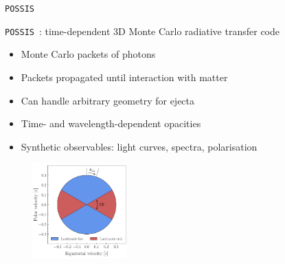 \documentclass[usenames,dvipsnames,t]{beamer}
\begin{document}
\begin{frame}{\texttt{POSSIS}}

  \def\x{2.5mm}

  \texttt{POSSIS}~\cite{Bulla:2019muo}: time-dependent 3D Monte Carlo radiative transfer code


  \begin{itemize}
    \item Monte Carlo packets of photons
    
    \vspace{\x}
    
    \item Packets propagated until interaction with matter
    
    \vspace{\x}
    
    \item Can handle arbitrary geometry for ejecta
    
    \vspace{\x}
    
    \item Time- and wavelength-dependent opacities
    
    \vspace{\x}
    
    \item Synthetic observables: light curves, spectra, polarisation
    
    
  \end{itemize}

  \begin{figure}
    \centering
    \includegraphics[width=0.325\textwidth]{Figures/bulla_model.png}
  \end{figure}
  
\end{frame}
\end{document}
